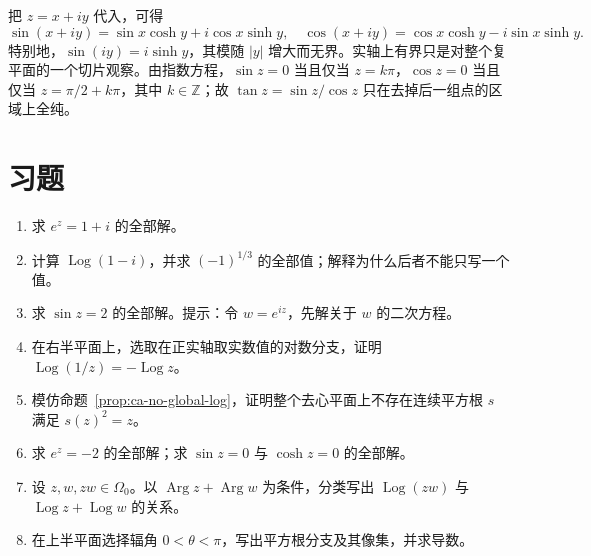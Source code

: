 把 $z=x+iy$ 代入，可得
\[
 \sin(x+iy)=\sin x\cosh y+i\cos x\sinh y,
 \quad
 \cos(x+iy)=\cos x\cosh y-i\sin x\sinh y.
\]
特别地，$\sin(iy)=i\sinh y$，其模随 $|y|$ 增大而无界。实轴上有界只是对整个复平面的一个切片观察。由指数方程，$\sin z=0$ 当且仅当 $z=k\pi$，$\cos z=0$ 当且仅当 $z=\pi/2+k\pi$，其中 $k\in\mathbb Z$；故 $\tan z=\sin z/\cos z$ 只在去掉后一组点的区域上全纯。

\section{习题}
\label{sec:ca-elementary-ex}
\begin{enumerate}
 \item 求 $e^z=1+i$ 的全部解。
 \item 计算 $\operatorname{Log}(1-i)$，并求 $(-1)^{1/3}$ 的全部值；解释为什么后者不能只写一个值。
 \item 求 $\sin z=2$ 的全部解。提示：令 $w=e^{iz}$，先解关于 $w$ 的二次方程。
 \item 在右半平面上，选取在正实轴取实数值的对数分支，证明 $\operatorname{Log}(1/z)=-\operatorname{Log}z$。
 \item\label{ex:ca-no-square-root} 模仿命题~\ref{prop:ca-no-global-log}，证明整个去心平面上不存在连续平方根 $s$ 满足 $s(z)^2=z$。

  \item\label{ex:ca-exp-solutions} 求 $e^z=-2$ 的全部解；求 $\sin z=0$ 与 $\cosh z=0$ 的全部解。
  \item\label{ex:ca-log-product} 设 $z,w,zw\in \Omega_0$。以 $\operatorname{Arg}z+\operatorname{Arg}w$ 为条件，分类写出 $\operatorname{Log}(zw)$ 与 $\operatorname{Log}z+\operatorname{Log}w$ 的关系。
  \item\label{ex:ca-square-root-domain} 在上半平面选择辐角 $0<\theta<\pi$，写出平方根分支及其像集，并求导数。
\end{enumerate}

